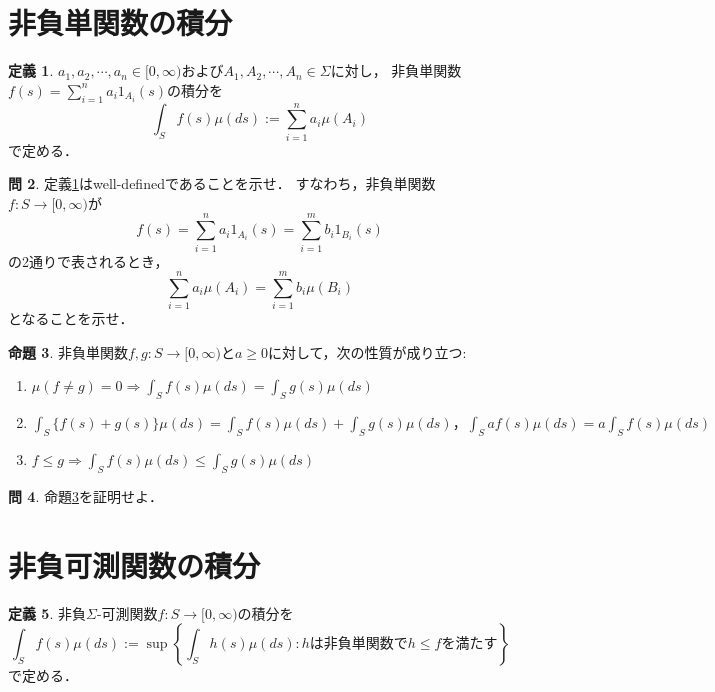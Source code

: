 \documentclass{jsreport}
\theoremstyle{definition}
\newtheorem{defi}{定義}[section]
\newtheorem{prop}[defi]{命題}
\newtheorem{qst}[defi]{問}
\begin{document}
\section{非負単関数の積分}

\begin{defi}\label{def_nonnegative_simple_function_integral}
$a_1,a_2,\cdots,a_n\in[0,\infty)$および$A_1,A_2,\cdots,A_n\in\Sigma$に対し，
非負単関数$f(s)=\displaystyle\sum_{i=1}^n a_i1_{A_i}(s)$の積分を
\[ \int_S f(s)\mu(ds):=\sum_{i=1}^n a_i\mu(A_i) \]
で定める．
\end{defi}

\begin{qst}\label{qst_simple_function_integral}
定義\ref{def_nonnegative_simple_function_integral}はwell-definedであることを示せ．
すなわち，非負単関数$f \colon S\to[0,\infty)$が
\[ f(s)=\sum_{i=1}^n a_i1_{A_i}(s)=\sum_{i=1}^m b_i1_{B_i}(s) \]
の2通りで表されるとき，
\[ \sum_{i=1}^n a_i\mu(A_i)=\sum_{i=1}^m b_i\mu(B_i) \]
となることを示せ．
\end{qst}

\begin{prop}\label{prop_properties_of_simple_function_integral}
非負単関数$f,g \colon S\to[0,\infty)$と$a\geq0$に対して，次の性質が成り立つ:
\begin{enumerate}
\item$\mu(f \neq g)=0\Rightarrow\displaystyle\int_S f(s)\mu(ds)=\int_S g(s)\mu(ds)$
\item$\displaystyle\int_S \{f(s)+g(s)\}\mu(ds)=\int_S f(s)\mu(ds)+\int_S g(s)\mu(ds)，
\int_S af(s)\mu(ds)=a\int_S f(s)\mu(ds)$
\item$f \leq g\Rightarrow\displaystyle\int_S f(s)\mu(ds)\leq\int_S g(s)\mu(ds)$
\end{enumerate}
\end{prop}

\begin{qst}\label{qst_proof_of_properties_of_simple_function_integral}
命題\ref{prop_properties_of_simple_function_integral}を証明せよ．
\end{qst}

\section{非負可測関数の積分}

\begin{defi}\label{def_nonnegative_function_integral}
非負$\Sigma$-可測関数$f \colon S\to\mathbb[0,\infty)$の積分を
\[ \int_S f(s)\mu(ds):=\sup\left\{\int_Sh(s)\mu(ds):hは非負単関数でh \leq fを満たす\right\} \]
で定める．
\end{defi}
\end{document}

